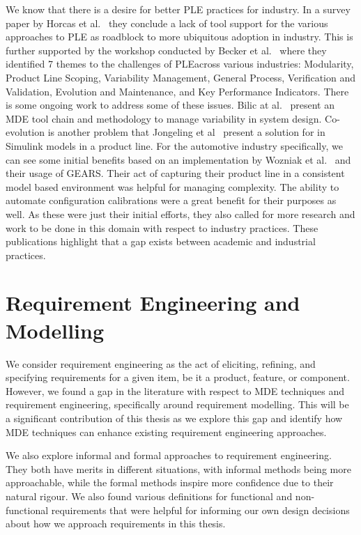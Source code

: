 We know that there is a desire for better \ac{PLE} practices for industry. In a survey paper by Horcas et al.~\cite{horcas2019software} they conclude a lack of tool support for the various approaches to \ac{PLE} as roadblock to more ubiquitous adoption in industry. This is further supported by the workshop conducted by Becker et al.~\cite{becker2024not} where they identified 7 themes to the challenges of \ac{PLE}across various industries: Modularity, Product Line Scoping, Variability Management, General Process, Verification and Validation, Evolution and Maintenance, and Key Performance Indicators. There is some ongoing work to address some of these issues. Bilic at al.~\cite{bilic2019integrated} present an \ac{MDE} tool chain and methodology to manage variability in system design. Co-evolution is another problem that Jongeling et al~\cite{jongeling2020co} present a solution for in Simulink models in a product line. For the automotive industry specifically, we can see some initial benefits based on an implementation by Wozniak et al.~\cite{10.1145/2791060.2791071} and their usage of GEARS. Their act of capturing their product line in a consistent model based environment was helpful for managing complexity. The ability to automate configuration calibrations were a great benefit for their purposes as well. As these were just their initial efforts, they also called for more research and work to be done in this domain with respect to industry practices. These publications highlight that a gap exists between academic and industrial practices. 

\section{Requirement Engineering and Modelling}

We consider requirement engineering as the act of eliciting, refining, and specifying requirements for a given item, be it a product, feature, or component. However, we found a gap in the literature with respect to \ac{MDE} techniques and requirement engineering, specifically around requirement modelling. This will be a significant contribution of this thesis as we explore this gap and identify how \ac{MDE} techniques can enhance existing requirement engineering approaches.

We also explore informal and formal approaches to requirement engineering. They both have merits in different situations, with informal methods being more approachable, while the formal methods inspire more confidence due to their natural rigour. We also found various definitions for functional and non-functional requirements that were helpful for informing our own design decisions about how we approach requirements in this thesis.

